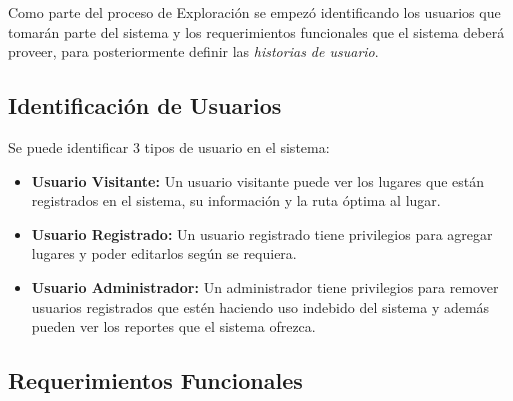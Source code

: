 Como parte del proceso de Exploración se empezó identificando los usuarios que tomarán parte del sistema y los requerimientos funcionales que el sistema deberá proveer, para posteriormente definir las \emph{historias de usuario}.


\subsection{Identificación de Usuarios}

Se puede identificar 3 tipos de usuario en el sistema:

\begin{itemize}

\item \textbf{Usuario Visitante:} Un usuario visitante puede ver los lugares que están registrados en el sistema, su información y la ruta óptima al lugar.

\item \textbf{Usuario Registrado:} Un usuario registrado tiene privilegios para agregar lugares y poder editarlos según se requiera.

\item \textbf{Usuario Administrador:} Un administrador tiene privilegios para remover usuarios registrados que estén haciendo uso indebido del sistema y además pueden ver los reportes que el sistema ofrezca.

\end{itemize}


\subsection{Requerimientos Funcionales}


%




